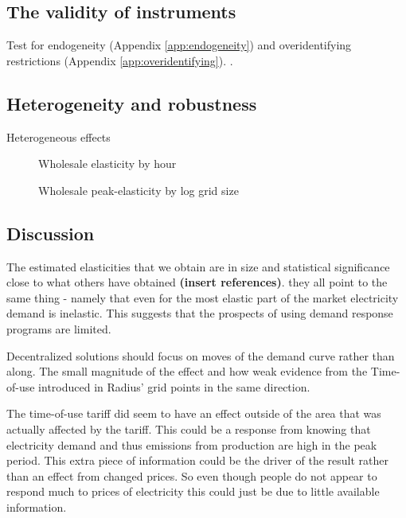\subsection{The validity of instruments}
\label{subsec:r_validity}
Test for endogeneity (Appendix \ref{app:endogeneity}) and overidentifying restrictions (Appendix \ref{app:overidentifying}). \citep{statacorp2017stata}.
\medskip\\


\subsection{Heterogeneity and robustness}
\label{subsec:r_robustness}


Heterogeneous effects
\begin{figure}[H]
  \centering
  \caption{Wholesale elasticity by hour}
  \label{fig:ws_elasticity_hour}
\end{figure}

\begin{figure}[H]
  \centering
  \caption{Wholesale peak-elasticity by log grid size}
  \label{fig:ws_elasticity_grid}
\end{figure}


\subsection{Discussion}
\label{subsec:r_discussion}

The estimated elasticities that we obtain are in size and statistical significance close to what others have obtained\textbf{ (insert references)}.  they all point to the same thing - namely that even for the most elastic part of the market electricity demand is inelastic. This suggests that the prospects of using demand response programs are limited.

Decentralized solutions should focus on moves of the demand curve rather than along.
The small magnitude of the effect and how weak evidence from the Time-of-use introduced in Radius' grid points in the same direction.
\par

The time-of-use tariff did seem to have an effect outside of the area that was actually affected by the tariff. This could be a response from knowing that electricity demand and thus emissions from production are high in the peak period. This extra piece of information could be the driver of the result rather than an effect from changed prices. So even though people do not appear to respond much to prices of electricity this could just be due to little available information.
\par


